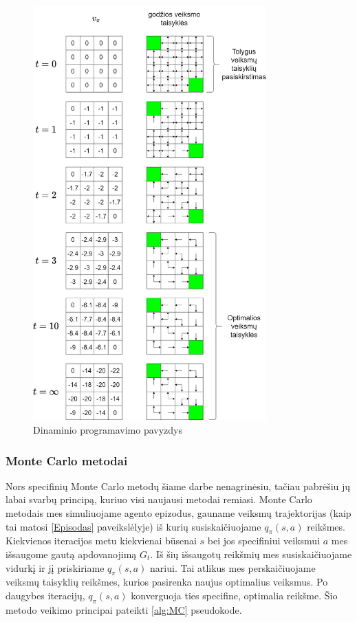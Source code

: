 \documentclass[a4paper, 12pt]{article}
\begin{document}
\begin{figure}[ht!]
\centering
\includegraphics[width=0.8\textwidth]{DynamicProgrammingExample}
\caption{Dinaminio programavimo pavyzdys}
\label{DynamicProgrammingExample}
\end{figure}


\clearpage
\subsubsection{Monte Carlo metodai}

Nors specifinių Monte Carlo metodų šiame darbe nenagrinėsiu, tačiau pabrėšiu jų labai svarbų principą, kuriuo visi naujausi metodai remiasi. Monte Carlo metodais mes simuliuojame agento epizodus, gauname veiksmų trajektorijas (kaip tai matosi \ref{Episodas} paveikslėlyje) iš kurių susiskaičiuojame $q_{\pi}(s, a)$ reikšmes. Kiekvienos iteracijos metu kiekvienai būsenai $s$ bei jos specifiniui veiksmui $a$ mes išsaugome gautą apdovanojimą $G_t$. Iš šių išsaugotų reikšmių mes susiskaičiuojame vidurkį ir jį priskiriame $q_{\pi}(s, a)$ nariui. Tai atlikus mes perskaičiuojame veiksmų taisyklių reikšmes, kurios pasirenka naujus optimalius veiksmus. Po daugybes iteracijų, $q_{\pi}(s, a)$ konverguoja ties specifine, optimalia reikšme. Šio metodo veikimo principai pateikti \ref{alg:MC} pseudokode.
\end{document}
